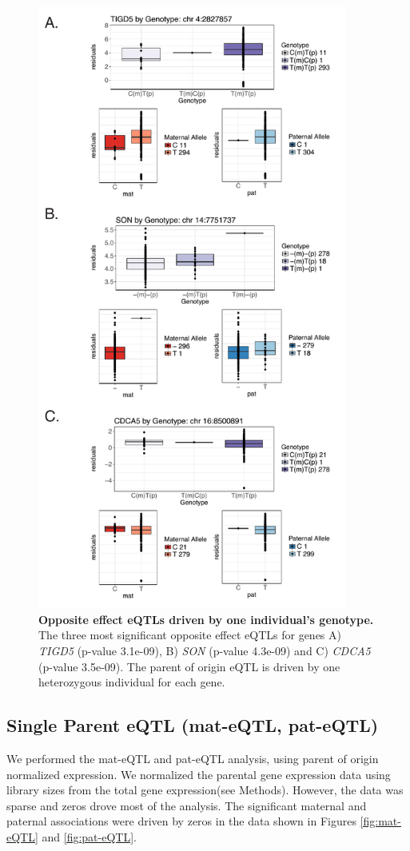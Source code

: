 \begin{figure}[!htb]
\centering \includegraphics[width=4in]{img/ch04/fig-01-oeQTLs.pdf}
\caption[Opposite effect eQTLs driven by one individual's genotype.]{\textbf{Opposite effect eQTLs driven by one individual's genotype.} The three most significant opposite effect eQTLs for genes A) \emph{TIGD5} (p-value 3.1e-09), B) \emph{SON} (p-value 4.3e-09) and C) \emph{CDCA5} (p-value 3.5e-09). The parent of origin eQTL is driven by one heterozygous individual for each gene.}
\label{fig:oeQTL}
\end{figure}
\clearpage

\subsection{Single Parent eQTL (mat-eQTL, pat-eQTL)}\label{Single Parent eQTL (mat-eQTL, pat-eQTL)} 
We performed the mat-eQTL and pat-eQTL analysis, using parent of origin normalized expression. We normalized the parental gene expression data using library sizes from the total gene expression(see Methods). However, the data was sparse and zeros drove most of the analysis. The significant maternal and paternal associations were driven by zeros in the data shown in Figures \ref{fig:mat-eQTL} and \ref{fig:pat-eQTL}. 

